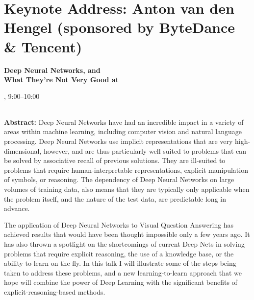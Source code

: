 \section{Keynote Address: Anton van den Hengel (sponsored by ByteDance \& Tencent)}

\begin{center}
\begin{Large}
  {\bfseries\Large Deep Neural Networks, and\\What They’re Not Very Good at} \vspace{1em}\par
\end{Large}


\daydateyear, 9:00--10:00 \vspace{1em}\\
\PlenaryLoc \\
\vspace{1em}\par
\end{center}

\noindent

{\bf Abstract:} Deep Neural Networks have had an incredible impact in a variety of areas within machine learning, including computer vision and natural language processing. Deep Neural Networks use implicit representations that are very high-dimensional, however, and are thus particularly well suited to problems that can be solved by associative recall of previous solutions. They are ill-suited to problems that require human-interpretable representations, explicit manipulation of symbols, or reasoning. The dependency of Deep Neural Networks on large volumes of training data, also means that they are typically only applicable when the problem itself, and the nature of the test data, are predictable long in advance.

The application of Deep Neural Networks to Visual Question Answering has achieved results that would have been thought impossible only a few years ago. It has also thrown a spotlight on the shortcomings of current Deep Nets in solving problems that require explicit reasoning, the use of a knowledge base, or the ability to learn on the fly. In this talk I will illustrate some of the steps being taken to address these problems, and a new learning-to-learn approach that we hope will combine the power of Deep Learning with the significant benefits of explicit-reasoning-based methods.


